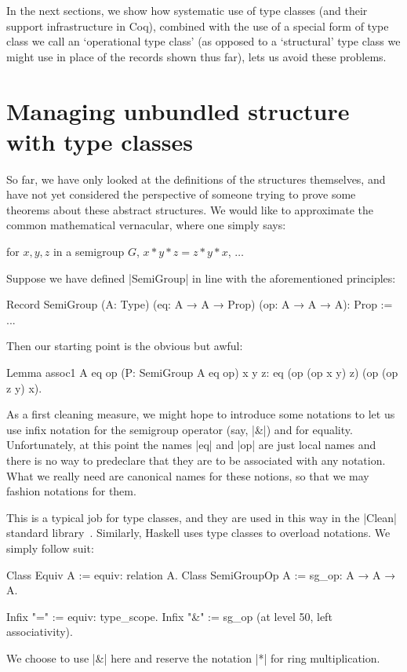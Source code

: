 \documentclass[a4paper,10pt, runningheads]{llncs}
\begin{document}
In the next sections, we show how systematic use of type classes (and their support infrastructure
in Coq), combined with the use of a special form of type class we call an `operational type class'
(as opposed to a `structural' type class we might use in place of the records shown thus far), lets
us avoid these problems.

\section{Managing unbundled structure with type classes}

So far, we have only looked at the definitions of the structures themselves, and have not yet
considered the perspective of someone trying to prove some theorems about these abstract structures.
We would like to approximate the common mathematical vernacular, where one
simply says:

for $x, y, z$ in a semigroup $G$, $x * y * z = z * y * x$, $\ldots$

Suppose we have defined |SemiGroup| in line with the aforementioned principles:
\begin{code}
Record SemiGroup (A: Type) (eq: A → A → Prop)
 (op: A → A → A): Prop := ...
\end{code}
Then our starting point is the obvious but awful:
\begin{code}
Lemma assoc1 A eq op (P: SemiGroup A eq op) x y z:
                   eq (op (op x y) z) (op (op z y) x).
\end{code}
As a first cleaning measure, we might hope to introduce some notations to let us use infix notation
for the semigroup operator (say, |&|) and for equality. Unfortunately, at this point the names |eq|
and |op| are just local names and there is no way to predeclare that they are to be associated with
any notation. What we really need are canonical names for these notions, so that we may fashion
notations for them.

This is a typical job for type classes, and they are used in this way in the |Clean| standard
library~\cite{Clean}. Similarly, Haskell uses type classes to overload notations.
We simply follow suit:
\begin{code}
  Class Equiv A := equiv: relation A.
  Class SemiGroupOp A := sg_op: A → A → A.

  Infix "=" := equiv: type_scope.
  Infix "&" := sg_op (at level 50, left associativity).
\end{code}
We choose to use |&| here and reserve the notation |*| for ring multiplication.
\end{document}
